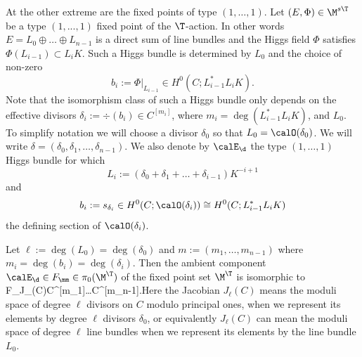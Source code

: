 \begin{example}
\notready	\label{ex111} At the other extreme are the fixed points of type $(1,\dots,1)$. Let $(E,\Phi)\in \M^{s\T}$ be a type $(1,...,1)$ fixed point of the $\T$-action. In other words $E=L_0\oplus\dots \oplus L_{n-1}$ is a direct sum of line bundles and the Higgs field $\Phi$ satisfies $\Phi(L_{i-1})\subset L_{i}K$. Such a Higgs bundle is determined by $L_0$ and the choice of non-zero  $$b_i:=\Phi|_{L_{i-1}}\in H^0(C;L_{i-1}^*L_{i}K).$$ Note that the isomorphism class of such a Higgs bundle only depends on the effective divisors $\delta_i:=\div(b_i)\in C^{[m_i]}$, where $m_i=\deg(L_{i-1}^*L_{i}K)$, and $L_0$. To simplify notation we will choose a divisor $\delta_0$ so that $L_0=\calO(\delta_0)$. We will write $\delta=(\delta_0,\delta_1,\dots,\delta_{n-1})$. We also denote by $\calE_{\d}$ the type $(1,\dots,1)$ Higgs bundle for which $$L_i:=(\delta_0+\delta_1+\dots+\delta_{i-1})K^{-i+1}$$ and  $$b_i:=s_{\delta_i}\in H^0(C;\calO(\delta_i))\cong H^0(C;L_{i-1}^*L_{i}K)$$ the defining section of $\calO(\delta_i)$.


	Let $\ell:=\deg(L_0)=\deg(\delta_0)$ and  $m:=(m_1,\dots,m_{n-1})$ where $m_i=\deg(b_i)=\deg(\delta_i)$. Then the ambient component $\calE_{\d}\in F_{\mm}\in \pi_0(\M^\T)$ of the fixed point set $\M^\T$ is isomorphic to  \beq\label{type111fix}F_{\mm}\cong J_\ell(C)\times C^{[m_1]}\times \dots \times C^{[m_{n-1}]}.\eeq Here the Jacobian $J_\ell(C)$ means the moduli space of degree $\ell$ divisors on $C$ modulo principal ones, when we represent its elements by degree $\ell$ divisors $\delta_0$, or equivalently $J_\ell(C)$ can mean the moduli space of degree $\ell$ line bundles when we represent its elements by the line bundle $L_0$.
\end{example}
